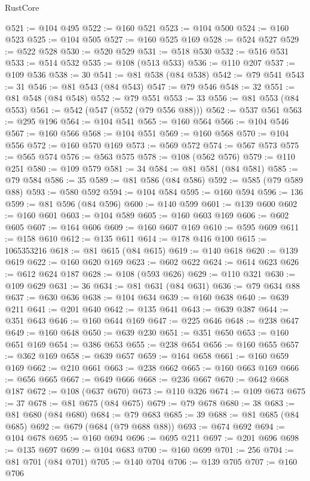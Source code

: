 \begin{lexlean}{RustCore}
\begin{coremodule}
@521 := @104 @495
@522 := @160 @521
@523 := @104 @500
@524 := @160 @523
@525 := @104 @505
@527 := @160 @525 @169
@528 := @524 @527
@529 := @522 @528
@530 := @520 @529
@531 := @518 @530
@532 := @516 @531
@533 := @514 @532
@535 := @108 (@513 @533)
@536 := @110 @207
@537 := @109 @536
@538 := 30
@541 := @81 @538 (@84 @538)
@542 := @79 @541
@543 := 31
@546 := @81 @543 (@84 @543)
@547 := @79 @546
@548 := 32
@551 := @81 @548 (@84 @548)
@552 := @79 @551
@553 := 33
@556 := @81 @553 (@84 @553)
@561 := @542 (@547 (@552 (@79 @556 @88)))
@562 := @537 @561
@563 := @295 @196
@564 := @104 @541
@565 := @160 @564
@566 := @104 @546
@567 := @160 @566
@568 := @104 @551
@569 := @160 @568
@570 := @104 @556
@572 := @160 @570 @169
@573 := @569 @572
@574 := @567 @573
@575 := @565 @574
@576 := @563 @575
@578 := @108 (@562 @576)
@579 := @110 @251
@580 := @109 @579
@581 := 34
@584 := @81 @581 (@84 @581)
@585 := @79 @584
@586 := 35
@589 := @81 @586 (@84 @586)
@592 := @585 (@79 @589 @88)
@593 := @580 @592
@594 := @104 @584
@595 := @160 @594
@596 := 136
@599 := @81 @596 (@84 @596)
@600 := @140 @599
@601 := @139 @600
@602 := @160 @601
@603 := @104 @589
@605 := @160 @603 @169
@606 := @602 @605
@607 := @164 @606
@609 := @160 @607 @169
@610 := @595 @609
@611 := @158 @610
@612 := @135 @611
@614 := @178 @416 @100
@615 := 1065353216
@618 := @81 @615 (@84 @615)
@619 := @140 @618
@620 := @139 @619
@622 := @160 @620 @169
@623 := @602 @622
@624 := @614 @623
@626 := @612 @624 @187
@628 := @108 (@593 @626)
@629 := @110 @321
@630 := @109 @629
@631 := 36
@634 := @81 @631 (@84 @631)
@636 := @79 @634 @88
@637 := @630 @636
@638 := @104 @634
@639 := @160 @638
@640 := @639 @211
@641 := @201 @640
@642 := @135 @641
@643 := @639 @387
@644 := @351 @643
@646 := @160 @644 @169
@647 := @225 @646
@648 := @238 @647
@649 := @160 @648
@650 := @639 @230
@651 := @351 @650
@653 := @160 @651 @169
@654 := @386 @653
@655 := @238 @654
@656 := @160 @655
@657 := @362 @169
@658 := @639 @657
@659 := @164 @658
@661 := @160 @659 @169
@662 := @210 @661
@663 := @238 @662
@665 := @160 @663 @169
@666 := @656 @665
@667 := @649 @666
@668 := @236 @667
@670 := @642 @668 @187
@672 := @108 (@637 @670)
@673 := @110 @326
@674 := @109 @673
@675 := 37
@678 := @81 @675 (@84 @675)
@679 := @79 @678
@680 := 38
@683 := @81 @680 (@84 @680)
@684 := @79 @683
@685 := 39
@688 := @81 @685 (@84 @685)
@692 := @679 (@684 (@79 @688 @88))
@693 := @674 @692
@694 := @104 @678
@695 := @160 @694
@696 := @695 @211
@697 := @201 @696
@698 := @135 @697
@699 := @104 @683
@700 := @160 @699
@701 := 256
@704 := @81 @701 (@84 @701)
@705 := @140 @704
@706 := @139 @705
@707 := @160 @706

\end{coremodule}
\end{lexlean}
